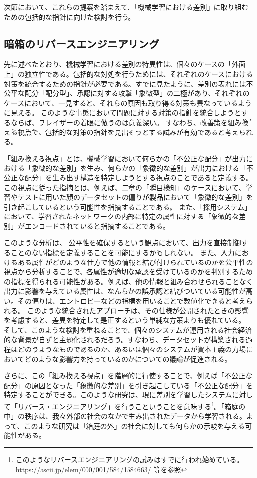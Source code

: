 \documentclass[b5j,twoside,twocolumn]{utarticle}
\newcommand{\mysubsection}[1]{\vspace{-6mm}\subsection{#1}\vspace{-2mm}}
\begin{document}
次節において、これらの提案を踏まえて、「機械学習における差別」に取り組むための包括的な指針に向けた検討を行う。

\mysubsection{暗箱のリバースエンジニアリング}
先に述べたとおり、機械学習における差別の特異性は、個々のケースの「外面上」の独立性である。包括的な対処を行うためには、それぞれのケースにおける対策を統合するための指針が必要である。すでに見たように、差別の表れには不公平な配分「配分型」、承認に対する攻撃「象徴型」の二極があり、それぞれのケースにおいて、一見すると、それらの原因も取り得る対策も異なっているように見える。
このような事態において問題に対する対策の指針を統合しようとするならば、フレイザーの着眼に倣うのは意義深い。
すなわち、改善策を\.組\.み\.換\.え\.る\.視\.点で、包括的な対策の指針を見出そうとする試みが有効であると考えられる。


「組み換える視点」とは、機械学習において何らかの「不公正な配分」が出力における「象徴的な差別」を生み、何らかの「象徴的な差別」が出力における「不公正な配分」を生み出す構造を特定しようとする視点のことであると定義する。この視点に従った指摘とは、例えば、二章の「瞬目検知」のケースにおいて、学習やテストに用いた顔のデータセットの偏りが製品において「象徴的な差別」を引き起こしているという可能性を指摘することである。
また、「採用システム」において、学習されたネットワークの内部に特定の属性に対する「象徴的な差別」がエンコードされていると指摘することである。


このような分析は、
公平性を確保するという観点において、出力を直接制御することのない指標を定義することを可能にするかもしれない。
また、入力におけるある属性がどのような仕方で他の情報と結び付けられているのかを公平性の視点から分析することで、各属性が適切な承認を受けているのかを判別するための指標を得られる可能性がある。例えば、他の情報と組み合わせられることなく出力に影響を与えている属性は、なんらかの誤承認と結びついている可能性が高い。その偏りは、エントロピーなどの指標を用いることで数値化できると考えられる。
このような統合されたアプローチは、その仕様が公開されたときの影響を考慮すると、差異を特定して是正するという単純な方策よりも優れている。
そして、このような検討を重ねることで、個々のシステムが運用される社会経済的な背景が自ずと主題化されるだろう。すなわち、データセットが構築される過程はどのうようなものであるのか、あるいは個々のシステムが資本主義の力場においてどのような影響力を持っているのかについての議論が促進される。


さらに、この「組み換える視点」を階層的に行使することで、例えば「不公正な配分」の原因となった「象徴的な差別」を引き起こしている「不公正な配分」を特定することができる。このような研究は、現に差別を学習したシステムに対して「リバース・エンジニアリング」を行うこということを意味する\footnote{このようなリバースエンジニアリングの試みはすでに行われ始めている。\cite{Tan_2018} https://ascii.jp/elem/000/001/584/1584663/ 等を参照}。「箱庭の中」の秩序は、我々外部の社会のなかで生み出されたデータから学習される。よって、このような研究は「箱庭の外」の社会に対しても何らかの示唆を与える可能性がある。
\end{document}
